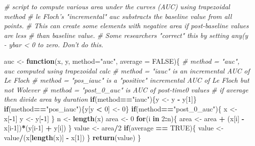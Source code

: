 \documentclass[]{book}
\newenvironment{Shaded}{\begin{snugshade}}{\end{snugshade}}
\newcommand{\CommentTok}[1]{\textcolor[rgb]{0.56,0.35,0.01}{\textit{#1}}}
\newcommand{\ControlFlowTok}[1]{\textcolor[rgb]{0.13,0.29,0.53}{\textbf{#1}}}
\newcommand{\DataTypeTok}[1]{\textcolor[rgb]{0.13,0.29,0.53}{#1}}
\newcommand{\DecValTok}[1]{\textcolor[rgb]{0.00,0.00,0.81}{#1}}
\newcommand{\KeywordTok}[1]{\textcolor[rgb]{0.13,0.29,0.53}{\textbf{#1}}}
\newcommand{\NormalTok}[1]{#1}
\newcommand{\OperatorTok}[1]{\textcolor[rgb]{0.81,0.36,0.00}{\textbf{#1}}}
\newcommand{\OtherTok}[1]{\textcolor[rgb]{0.56,0.35,0.01}{#1}}
\newcommand{\StringTok}[1]{\textcolor[rgb]{0.31,0.60,0.02}{#1}}
\begin{document}
\begin{Shaded}
\begin{Highlighting}[]
\CommentTok{# script to compute various area under the curves (AUC) using trapezoidal method}
\CommentTok{# le Floch's "incremental" auc substracts the baseline value from all points.}
\CommentTok{# This can create some elements with negative area if post-baseline values are less}
\CommentTok{# than baseline value.}
\CommentTok{# Some researchers "correct" this by setting any(y - ybar < 0 to zero. Don't do this.}

\NormalTok{auc <-}\StringTok{ }\ControlFlowTok{function}\NormalTok{(x, y, }\DataTypeTok{method=}\StringTok{"auc"}\NormalTok{, }\DataTypeTok{average =} \OtherTok{FALSE}\NormalTok{)\{}
  \CommentTok{# method = "auc", auc computed using trapezoidal calc}
  \CommentTok{# method = "iauc" is an incremental AUC of Le Floch}
  \CommentTok{# method = "pos_iauc" is a "positive" incremental AUC of Le Floch but not Wolever}
  \CommentTok{# method = "post_0_auc" is AUC of post-time0 values}
  \CommentTok{# if average then divide area by duration}
  \ControlFlowTok{if}\NormalTok{(method}\OperatorTok{==}\StringTok{"iauc"}\NormalTok{)\{y <-}\StringTok{ }\NormalTok{y }\OperatorTok{-}\StringTok{ }\NormalTok{y[}\DecValTok{1}\NormalTok{]\}}
  \ControlFlowTok{if}\NormalTok{(method}\OperatorTok{==}\StringTok{"pos_iauc"}\NormalTok{)\{y[y }\OperatorTok{<}\StringTok{ }\DecValTok{0}\NormalTok{] <-}\StringTok{ }\DecValTok{0}\NormalTok{\}}
  \ControlFlowTok{if}\NormalTok{(method}\OperatorTok{==}\StringTok{"post_0_auc"}\NormalTok{)\{}
\NormalTok{    x <-}\StringTok{ }\NormalTok{x[}\OperatorTok{-}\DecValTok{1}\NormalTok{]}
\NormalTok{    y <-}\StringTok{ }\NormalTok{y[}\OperatorTok{-}\DecValTok{1}\NormalTok{]}
\NormalTok{  \}}
\NormalTok{  n <-}\StringTok{ }\KeywordTok{length}\NormalTok{(x)}
\NormalTok{  area <-}\StringTok{ }\DecValTok{0}
  \ControlFlowTok{for}\NormalTok{(i }\ControlFlowTok{in} \DecValTok{2}\OperatorTok{:}\NormalTok{n)\{}
\NormalTok{    area <-}\StringTok{ }\NormalTok{area }\OperatorTok{+}\StringTok{ }\NormalTok{(x[i] }\OperatorTok{-}\StringTok{ }\NormalTok{x[i}\DecValTok{-1}\NormalTok{])}\OperatorTok{*}\NormalTok{(y[i}\DecValTok{-1}\NormalTok{] }\OperatorTok{+}\StringTok{ }\NormalTok{y[i])}
\NormalTok{  \}}
\NormalTok{  value <-}\StringTok{ }\NormalTok{area}\OperatorTok{/}\DecValTok{2}
  \ControlFlowTok{if}\NormalTok{(average }\OperatorTok{==}\StringTok{ }\OtherTok{TRUE}\NormalTok{)\{}
\NormalTok{    value <-}\StringTok{ }\NormalTok{value}\OperatorTok{/}\NormalTok{(x[}\KeywordTok{length}\NormalTok{(x)] }\OperatorTok{-}\StringTok{ }\NormalTok{x[}\DecValTok{1}\NormalTok{])}
\NormalTok{  \}}
  \KeywordTok{return}\NormalTok{(value)}
\NormalTok{\}}
\end{Highlighting}
\end{Shaded}
\end{document}
